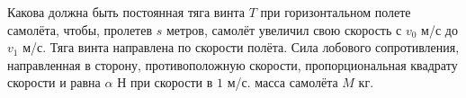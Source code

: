 Какова должна быть постоянная тяга винта $T$ при горизонтальном
полете самолёта, чтобы, пролетев $s$ метров, самолёт увеличил
свою скорость с $v_{0}$ м/с до $v_{1}$ м/с. Тяга винта направлена
по скорости полёта. Сила лобового сопротивления, направленная в сторону,
противоположную скорости, пропорциональная квадрату
скорости и равна $\alpha$ Н при скорости в $1$ м/с. масса самолёта $M$
кг.
